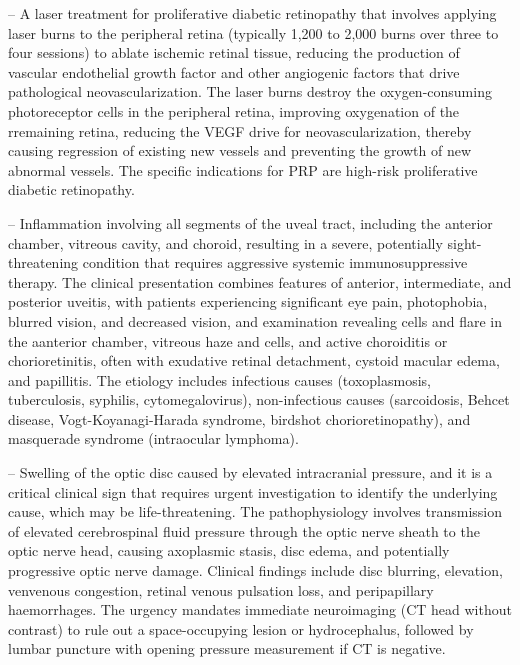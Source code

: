 -- A laser treatment for proliferative diabetic retinopathy that involves applying laser burns to the peripheral retina (typically 1,200 to 2,000 burns over three to four sessions) to ablate ischemic retinal tissue, reducing the production of vascular endothelial growth factor and other angiogenic factors that drive pathological neovascularization. The laser burns destroy the oxygen-consuming photoreceptor cells in the peripheral retina, improving oxygenation of the rremaining retina, reducing the VEGF drive for neovascularization, thereby causing regression of existing new vessels and preventing the growth of new abnormal vessels. The specific indications for PRP are high-risk proliferative diabetic retinopathy.

-- Inflammation involving all segments of the uveal tract, including the anterior chamber, vitreous cavity, and choroid, resulting in a severe, potentially sight-threatening condition that requires aggressive systemic immunosuppressive therapy. The clinical presentation combines features of anterior, intermediate, and posterior uveitis, with patients experiencing significant eye pain, photophobia, blurred vision, and decreased vision, and examination revealing cells and flare in the aanterior chamber, vitreous haze and cells, and active choroiditis or chorioretinitis, often with exudative retinal detachment, cystoid macular edema, and papillitis. The etiology includes infectious causes (toxoplasmosis, tuberculosis, syphilis, cytomegalovirus), non-infectious causes (sarcoidosis, Behcet disease, Vogt-Koyanagi-Harada syndrome, birdshot chorioretinopathy), and masquerade syndrome (intraocular lymphoma).

-- Swelling of the optic disc caused by elevated intracranial pressure, and it is a critical clinical sign that requires urgent investigation to identify the underlying cause, which may be life-threatening. The pathophysiology involves transmission of elevated cerebrospinal fluid pressure through the optic nerve sheath to the optic nerve head, causing axoplasmic stasis, disc edema, and potentially progressive optic nerve damage. Clinical findings include disc blurring, elevation, venvenous congestion, retinal venous pulsation loss, and peripapillary haemorrhages. The urgency mandates immediate neuroimaging (CT head without contrast) to rule out a space-occupying lesion or hydrocephalus, followed by lumbar puncture with opening pressure measurement if CT is negative.

